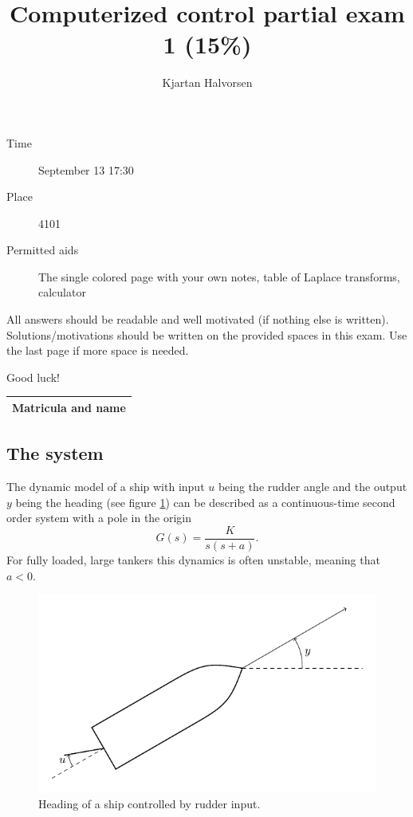 \documentclass[a4paper,12pt]{article}
\title{Computerized control partial exam 1 (15\%)}
\author{Kjartan Halvorsen}
\newcommand{\bmpl}{\begin{minipage}[t]{140mm}}
\newcommand{\emp}{\end{minipage}}
\begin{document}
\maketitle


\begin{description}
\item[Time] September 13 17:30
\item[Place] 4101
\item[Permitted aids] The single colored page with your own notes, table of Laplace transforms, calculator
\end{description}

All answers should be readable and well motivated (if nothing else is written). Solutions/motivations should be written on the provided spaces in this exam. Use the last page if more space is needed.

\begin{center}
{\Large Good luck!} \\
\end{center}

\begin{tabular}{|l|l|}
\hline
\multicolumn{2}{|l|}{\bmpl
Matricula and name
\vspace*{18mm}
\emp}\\
\hline

\end{tabular}

\clearpage

\subsection*{The system}
The dynamic model of a ship with input $u$ being the rudder angle and the output $y$ being the heading (see figure \ref{fig:tanker}) can be described as a continuous-time second order system with a pole in the origin
\[ G(s) = \frac{K}{s(s + a)}. \]
For fully loaded, large tankers this dynamics is often unstable, meaning that $a<0$.  
\begin{figure}[h]
\begin{center}
\includegraphics[width=0.8\linewidth]{tanker}
\caption{Heading of a ship controlled by rudder input.}
\label{fig:tanker}
\end{center}
\end{figure}
\end{document}
